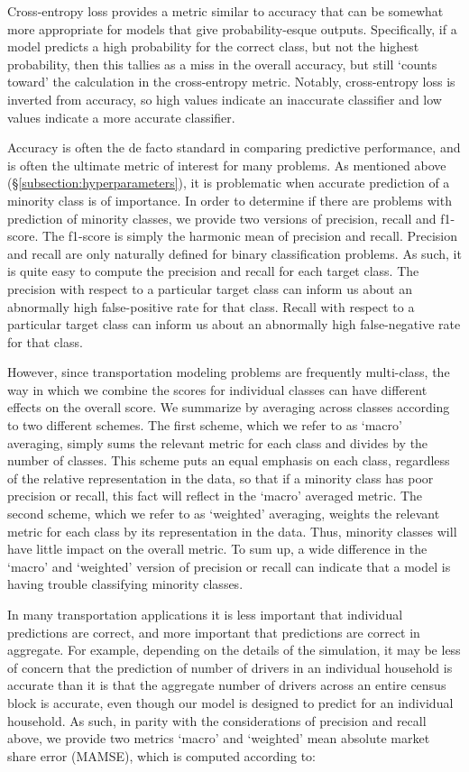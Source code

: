 \documentclass[conference]{IEEEtran}
\begin{document}
Cross-entropy loss provides a metric similar to accuracy that can be somewhat more appropriate for models that give probability-esque outputs.
 Specifically, if a model predicts a high probability for the correct class, but not the highest probability, then this tallies as a miss in the overall accuracy, but still `counts toward' the calculation in the cross-entropy metric.
 Notably, cross-entropy loss is inverted from accuracy, so high values indicate an inaccurate classifier and low values indicate a more accurate classifier.

Accuracy is often the de facto standard in comparing predictive performance, and is often the ultimate metric of interest for many problems.
 As mentioned above (\S \ref{subsection:hyperparameters}), it is problematic when accurate prediction of a minority class is of importance.
 In order to determine if there are problems with prediction of minority classes, we provide two versions of precision, recall and f1-score.
 The f1-score is simply the harmonic mean of precision and recall.
 Precision and recall are only naturally defined for binary classification problems.
 As such, it is quite easy to compute the precision and recall for each target class.
 The precision with respect to a particular target class can inform us about an abnormally high false-positive rate for that class.
 Recall with respect to a particular target class can inform us about an abnormally high false-negative rate for that class.
 
However, since transportation modeling problems are frequently multi-class, the way in which we combine the scores for individual classes can have different effects on the overall score.
 We summarize by averaging across classes according to two different schemes.
 The first scheme, which we refer to as `macro' averaging, simply sums the relevant metric for each class and divides by the number of classes.
 This scheme puts an equal emphasis on each class, regardless of the relative representation in the data, so that if a minority class has poor precision or recall, this fact will reflect in the `macro' averaged metric.
 The second scheme, which we refer to as `weighted' averaging, weights the relevant metric for each class by its representation in the data.
 Thus, minority classes will have little impact on the overall metric.
 To sum up, a wide difference in the `macro' and `weighted' version of precision or recall can indicate that a model is having trouble classifying minority classes.

In many transportation applications it is less important that individual predictions are correct, and more important that predictions are correct in aggregate.
 For example, depending on the details of the simulation, it may be less of concern that the prediction of number of drivers in an individual household is accurate than it is that the aggregate number of drivers across an entire census block is accurate, even though our model is designed to predict for an individual household.
 As such, in parity with the considerations of precision and recall above, we provide two metrics `macro' and `weighted' mean absolute market share error (MAMSE), which is computed according to:
\end{document}
